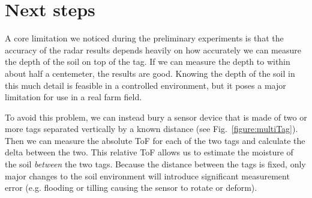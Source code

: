 \documentclass[12pt]{article}
\begin{document}
\section*{Next steps}

A core limitation we noticed during the preliminary experiments is
that the accuracy of the radar results depends heavily on how
accurately we can measure the depth of the soil on top of the tag. If
we can measure the depth to within about half a centemeter, the
results are good. Knowing the depth of the soil in this much detail is
feasible in a controlled environment, but it poses a major limitation
for use in a real farm field.

To avoid this problem, we can instead bury a sensor device that is
made of two or more tags separated vertically by a known distance (see
Fig.~\ref{figure:multiTag}). Then we can measure the absolute ToF for
each of the two tags and calculate the delta between the two. This
relative ToF allows us to estimate the moisture of the soil
\emph{between} the two tags. Because the distance between the tags is
fixed, only major changes to the soil environment will introduce
significant measurement error (e.g. flooding or tilling causing the
sensor to rotate or deform).
\end{document}
